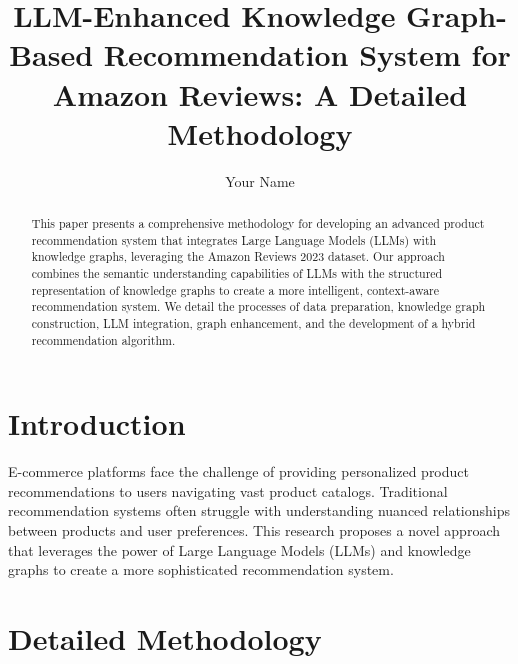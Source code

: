 \documentclass{article}
\title{LLM-Enhanced Knowledge Graph-Based Recommendation System for Amazon Reviews: A Detailed Methodology}
\author{Your Name}
\date{}
\begin{document}
\maketitle

\begin{abstract}
This paper presents a comprehensive methodology for developing an advanced product recommendation system that integrates Large Language Models (LLMs) with knowledge graphs, leveraging the Amazon Reviews 2023 dataset. Our approach combines the semantic understanding capabilities of LLMs with the structured representation of knowledge graphs to create a more intelligent, context-aware recommendation system. We detail the processes of data preparation, knowledge graph construction, LLM integration, graph enhancement, and the development of a hybrid recommendation algorithm.
\end{abstract}

\section{Introduction}
E-commerce platforms face the challenge of providing personalized product recommendations to users navigating vast product catalogs. Traditional recommendation systems often struggle with understanding nuanced relationships between products and user preferences. This research proposes a novel approach that leverages the power of Large Language Models (LLMs) and knowledge graphs to create a more sophisticated recommendation system.

\section{Detailed Methodology}
\end{document}
